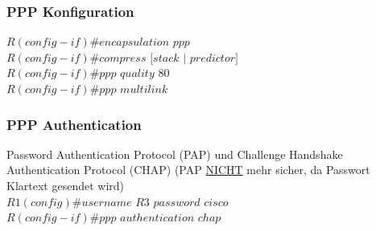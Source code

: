 \documentclass[landscape,twocolumn,a4paper]{article}
\begin{document}
\begin{footnotesize}
\subsubsection{PPP Konfiguration}
$R(config-if)\#encapsulation$ $ppp$\\
$R(config-if)\#compress$ $[stack$ $|$ $predictor]$\\
$R(config-if)\#ppp$ $quality$ $80$\\
$R(config-if)\#ppp$ $multilink$

\subsubsection{PPP Authentication}
Password Authentication Protocol (PAP) und Challenge Handshake Authentication Protocol (CHAP) (PAP \underline{NICHT} mehr sicher, da Passwort Klartext gesendet wird)\\
$R1(config)\#username$ $R3$ $password$ $cisco$\\
$R(config-if)\#ppp$ $authentication$ $chap$



\end{footnotesize}
\end{document}
